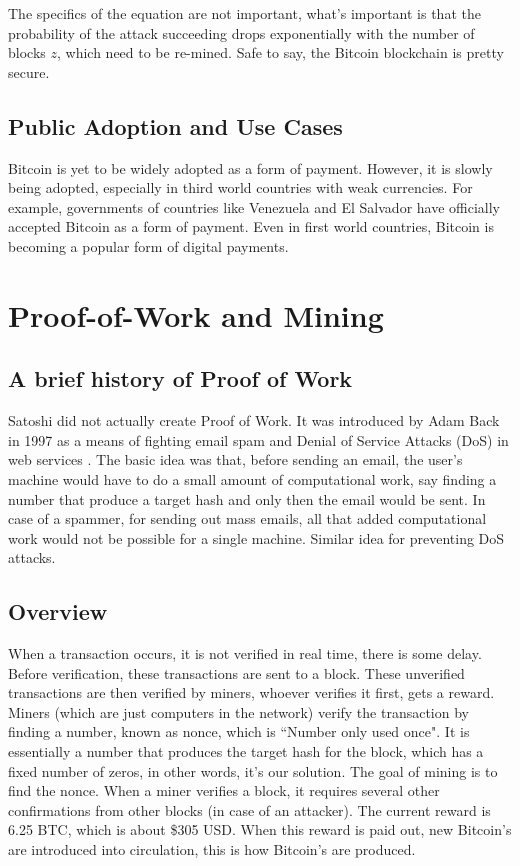 \documentclass[11pt]{article} %
\begin{document}
\noindent The specifics of the equation are not important, what's important is that the probability of the attack succeeding drops exponentially with the number of blocks $z$, which need to be re-mined. Safe to say, the Bitcoin blockchain is pretty secure.

\subsection{Public Adoption and Use Cases}{}
Bitcoin is yet to be widely adopted as a form of payment. However, it is slowly being adopted, especially in third world countries with weak currencies. For example, governments of countries like Venezuela and El Salvador have officially accepted Bitcoin as a form of payment. Even in first world countries, Bitcoin is becoming a popular form of digital payments. 


\section{Proof-of-Work and Mining}{}
\subsection{A brief history of Proof of Work}
Satoshi did not actually create Proof of Work. It was introduced by Adam Back in 1997 as a means of fighting email spam and Denial of Service Attacks (DoS) in web services \cite{7}. The basic idea was that, before sending an email, the user's machine would have to do a small amount of computational work, say finding a number that produce a target hash and only then the email would be sent. In case of a spammer, for sending out mass emails, all that added computational work would not be possible for a single machine. Similar idea for preventing DoS attacks.

\subsection{Overview}

When a transaction occurs, it is not verified in real time, there is some delay. Before verification, these transactions are sent to a block. These unverified transactions are then verified by miners, whoever verifies it first, gets a reward. Miners (which are just computers in the network) verify the transaction by finding a number, known as nonce, which is ``Number only used once". It is essentially a number that produces the target hash for the block, which has a fixed number of zeros, in other words, it's our solution. The goal of mining is to find the nonce. When a miner verifies a block, it requires several other confirmations from other blocks (in case of an attacker). The current reward is 6.25 BTC, which is about \$305 USD. When this reward is paid out, new Bitcoin's are introduced into circulation, this is how Bitcoin's are produced.
\end{document}
